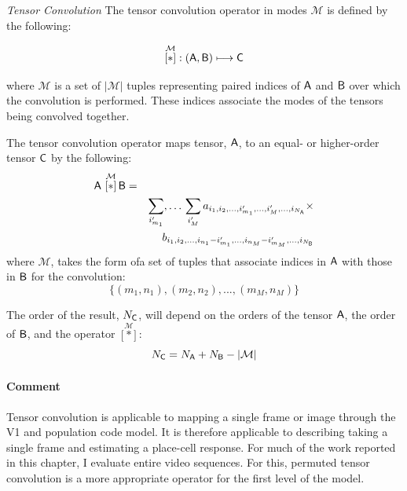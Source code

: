 \begin{definition}{\textit{Tensor Convolution}}\label{def:convop}  The tensor convolution operator in modes $\mathcal{M}$ is defined by the following:

\begin{equation}
 \overset{\mathcal{M}}{[ \ast ]}: \left (\mathsf{A},\mathsf{B}  \right ) \longmapsto \mathsf{C}
\end{equation}

 where $\mathcal{M}$ is a set of $|\mathcal{M}|$ tuples representing paired indices of $\mathsf{A}$ and $\mathsf{B}$ over which the convolution is performed.   These indices associate the modes of the tensors being convolved together.

The tensor convolution operator maps tensor, $\mathsf{A}$, to an equal- or higher-order tensor $\mathsf{C}$ by the following:
\begin{eqnarray}
\mathsf{A} \,\, \overset{\mathcal{M}}{[ \ast ]}\, {\mathsf{B}} &=& \nonumber \\
& &\sum_{i'_{m_1}},\ldots\,\sum_{i_{M}'}   a_{i_1,i_2,...,i_{m_1}',...,i_{M}',...,i_{N_{\mathsf{A}}}} \times \nonumber \\
& &b_{i_1,i_2,...,i_{n_1}-i_{m_1}',...,i_{n_M}-i_{m_M}',...,i_{N_{\mathsf{B}}}}
\label{eq:t1}
\end{eqnarray}
where $\mathcal{M}$, takes the form ofa set of tuples that associate indices in $\mathsf{A}$ with those in $\mathsf{B}$ for the convolution:
\begin{equation}
\lbrace(m_1,n_1),(m_2,n_2),...,(m_{M},n_{M})\rbrace
\end{equation}

The order of the result, $N_{\mathsf{C}}$, will depend on the orders of the tensor $\mathsf{A}$, the order of $\mathsf{B}$, and the operator  $\overset{\mathcal{M}}{[ \ast ]}$:
\begin{equation}
N_{\mathsf{C}} = N_{\mathsf{A}}+N_{\mathsf{B}}-|\mathcal{M}|
\end{equation}
\end{definition}

\paragraph{Comment}  Tensor convolution is applicable to mapping a single frame or image through the V1 and population code model.  It is therefore applicable to describing taking a single frame and estimating a place-cell response.  For much of the work reported in this chapter, I evaluate entire video sequences. For this, permuted tensor convolution is a more appropriate operator for the first level of the model.

